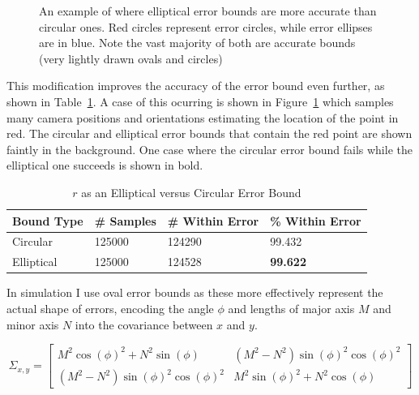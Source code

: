 \documentclass[a4paper,12pt,twoside,openright]{report}
\begin{document}
\begin{figure}[htb]
    \begin{center}
        
    \end{center}
    \caption[elliptical versus circular error]{An example of where elliptical error bounds are more accurate than circular ones. Red circles represent error circles, while error ellipses are in blue. Note the vast majority of both are accurate bounds (very lightly drawn ovals and circles)}
    \label{fig:camera:oval better}
\end{figure}

This modification improves the accuracy of the error bound even further, as shown
in Table~\ref{tab:camera:ellipse vs circle}. A case of this ocurring is shown
in Figure~\ref{fig:camera:oval better} which samples many camera positions and orientations
estimating the location of the point in red. The circular and elliptical 
error bounds that contain the red point are shown faintly in the background. One
case where the circular error bound fails while the elliptical one succeeds
is shown in bold.

\begin{table}[htb]
    \centering
    \caption[Elliptical versus Circular Error Bound]{$r$ as an Elliptical versus Circular Error Bound}
    \label{tab:camera:ellipse vs circle}
    \begin{tabular}{@{}llll@{}}
        \toprule
        Bound Type    & \# Samples  & \# Within Error& \% Within Error \\ \midrule
        Circular      &   125000              & 124290                  & 99.432  \\
        Elliptical    &   125000              & 124528                  & \textbf{99.622}
    \end{tabular}
\end{table}


In simulation I use oval error bounds as these more effectively represent the 
actual shape of errors, encoding the angle $\phi$ and lengths of major axis $M$
and minor axis $N$ into the covariance between $x$ and $y$.

\[
\Sigma_{x,y} =
  \begin{bmatrix}
    M^2 \cos(\phi)^2 + N^2 \sin(\phi) &  (M^2 - N^2) \sin(\phi)^2 \cos(\phi)^2 \\
    (M^2 - N^2) \sin(\phi)^2 \cos(\phi)^2  &  M^2 \sin(\phi)^2 + N^2\cos(\phi) 
  \end{bmatrix}
\]
\end{document}
